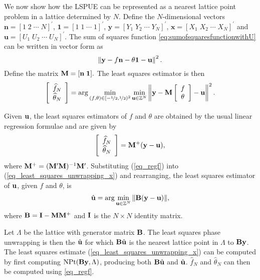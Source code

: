 We now show how the LSPUE can be represented as a nearest lattice point
problem in a lattice determined by $N$. Define the $N$-dimensional vectors
$\mathbf{n}=\left[1 \; 2 \; \cdots \; N\right]^{\prime}$, $\mathbf{1}=\left[1 \; 1 \; \cdots \; 1\right]^{\prime}$, $\mathbf{y}=\left[Y_1 \; Y_2 \; \cdots \; Y_N\right]^{\prime}$, $\mathbf{x}=\left[X_1 \; X_2 \; \cdots \; X_N\right]^{\prime}$ and $\mathbf{u}=\left[U_1 \; U_2 \; \cdots \; U_N\right]^{\prime}$. The sum of squares function
\eqref{eq:sumofsquaresfunctionwithU} can be written in vector form as
\begin{equation}\label{eq:vectorsumofsquares}
  \left\|\ybf - f\nbf - \theta\onebf - \ubf \right\|^2.
\end{equation}
Define the matrix $\mathbf{M} = [\mathbf{n} \; \boldsymbol{1}].$ The least squares estimator is then
\begin{equation}\label{eq_least_squares_unwrapping_x}
\left[ \begin{array}[c]{c} \widehat{f}_N \\ \widehat{\theta}_N \end{array} \right] = \arg\min_{(f,\theta)\in[-\nicefrac{1}{2},\nicefrac{1}{2})^2}\min_{\ubf \in \ints^N }\left\|\ybf - \Mbf\left[ \begin{array}[c]{c} f \\ \theta \end{array} \right] - \ubf \right\|^2.
\end{equation}

Given $\mathbf{u}$, the least squares estimators of $f$ and $\theta$ are obtained by
the usual linear regression formulae and are given by
\begin{equation} \label{eq_regf} \left[ \begin{array}[c]{c} \widehat{f}_N \\
      \widehat{\theta}_N \end{array} \right] = \Mbf^+ (\ybf - \ubf),
\end{equation}
where $\mathbf{M}^+ = (\mathbf{M}'\mathbf{M})^{-1}\mathbf{M}'$.  Substituting (\ref{eq_regf}) into
(\ref{eq_least_squares_unwrapping_x}) and rearranging, the least squares
estimator of $\mathbf{u}$, given $f$ and $\theta$, is
\begin{equation} \label{eq_minu}
\hat{\ubf} = \arg\min_{\ubf\in\ints^{N}} {\|\Bbf(\ybf - \ubf)\|},
\end{equation}
where $\mathbf{B} = \mathbf{I} - \mathbf{M}\mathbf{M}^+$ and $\mathbf{I}$ is the $N \times N$ identity
matrix.

Let $\Lambda$ be the lattice with generator matrix $\mathbf{B}$.  The least squares
phase unwrapping is then the $\hat{\mathbf{u}}$ for which $\mathbf{B}\hat{\mathbf{u}}$ is the
nearest lattice point in $\Lambda$ to $\mathbf{B}\mathbf{y}$.  The least squares estimate
(\ref{eq_least_squares_unwrapping_x}) can be computed by first computing
$\operatorname{NPt}(\mathbf{B}\mathbf{y}, \Lambda)$, producing both $\mathbf{B}\hat{\mathbf{u}}$ and $\hat{\mathbf{u}}$.
$\widehat{f}_N$ and $\widehat{\theta}_N$ can then be computed using
\eqref{eq_regf}.

